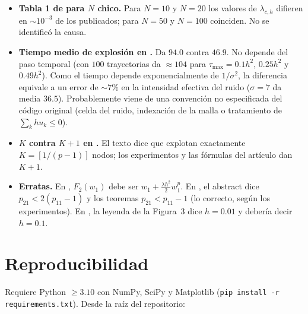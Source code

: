 \documentclass[11pt,a4paper]{article}
\newcommand{\code}[1]{\texttt{#1}}
\begin{document}
\begin{itemize}
\item \textbf{Tabla 1 de \cite{AFR} para $N$ chico.} Para $N=10$ y $N=20$
los valores de $\lambda_{c,h}$ difieren en $\sim10^{-3}$ de los publicados;
para $N=50$ y $N=100$ coinciden. No se identificó la causa.
\item \textbf{Tiempo medio de explosión en \cite{FG}.} Da $94.0$ contra
$46.9$. No depende del paso temporal (con $100$ trayectorias da $\approx104$
para $\tau_{\max}=0.1h^2$, $0.25h^2$ y $0.49h^2$). Como el tiempo depende
exponencialmente de $1/\sigma^2$, la diferencia equivale a un error de
$\sim7\%$ en la intensidad efectiva del ruido ($\sigma=7$ da media $36.5$).
Probablemente viene de una convención no especificada del código original
(celda del ruido, indexación de la malla o tratamiento de $\sum_khu_k\le0$).
\item \textbf{$K$ contra $K+1$ en \cite{FGR}.} El texto dice que explotan
exactamente $K=[1/(p-1)]$ nodos; los experimentos y las fórmulas del
artículo dan $K+1$.
\item \textbf{Erratas.} En \cite{FR}, $F_2(w_1)$ debe ser
$w_1+\frac{\lambda h^2}{2}w_1^p$. En \cite{AFGR-sys}, el abstract dice
$p_{21}<2(p_{11}-1)$ y los teoremas $p_{21}<p_{11}-1$ (lo correcto, según
los experimentos). En \cite{DFGRS}, la leyenda de la Figura~3 dice $h=0.01$
y debería decir $h=0.1$.
\end{itemize}

\section{Reproducibilidad}\label{sec:repro}

Requiere Python $\ge3.10$ con NumPy, SciPy y Matplotlib
(\code{pip install -r requirements.txt}). Desde la raíz del repositorio:
\end{document}
